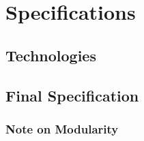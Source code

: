 \section{Specifications}
	

	

	
\subsection{Technologies}
	
	
	


\subsection{Final Specification}
			

		



		


\subsubsection{Note on Modularity}
		


